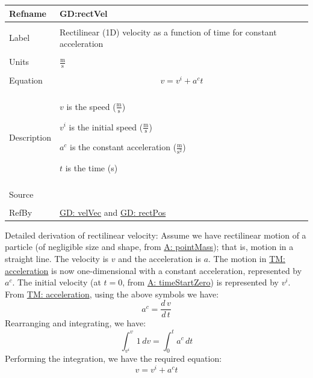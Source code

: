 \documentclass[12pt]{article}
\begin{document}
\noindent \begin{minipage}{\textwidth}
\begin{tabular}{p{} p{}}
\toprule \textbf{Refname} & \textbf{GD:rectVel}
\label{GD:rectVel}
\\ \midrule \\
Label & Rectilinear (1D) velocity as a function of time for constant acceleration
\\ \midrule \\
Units & $\frac{\text{m}}{\text{s}}$
\\ \midrule \\
Equation & \begin{displaymath}
           v={v^{i}}+{a^{c}} t
           \end{displaymath}
\\ \midrule \\
Description & \begin{symbDescription}
              \item{$v$ is the speed ($\frac{\text{m}}{\text{s}}$)}
              \item{${v^{i}}$ is the initial speed ($\frac{\text{m}}{\text{s}}$)}
              \item{${a^{c}}$ is the constant acceleration ($\frac{\text{m}}{\text{s}^{2}}$)}
              \item{$t$ is the time (s)}
              \end{symbDescription}
\\ \midrule \\
Source & \cite[(pg. 8)]{hibbeler2004}
\\ \midrule \\
RefBy & \hyperref[GD:velVec]{GD: velVec} and \hyperref[GD:rectPos]{GD: rectPos}
\\ \bottomrule \end{tabular}
\end{minipage}
Detailed derivation of rectilinear velocity:
Assume we have rectilinear motion of a particle (of negligible size and shape, from \hyperref[pointMass]{A: pointMass}); that is, motion in a straight line. The velocity is $v$ and the acceleration is $a$. The motion in \hyperref[TM:acceleration]{TM: acceleration} is now one-dimensional with a constant acceleration, represented by ${a^{c}}$. The initial velocity (at $t=0$, from \hyperref[timeStartZero]{A: timeStartZero}) is represented by ${v^{i}}$. From \hyperref[TM:acceleration]{TM: acceleration}, using the above symbols we have:
\begin{displaymath}
{a^{c}}=\frac{d\,v}{d\,t}
\end{displaymath}
Rearranging and integrating, we have:
\begin{displaymath}
\int_{{v^{i}}}^{v}{1}\,dv=\int_{0}^{t}{{a^{c}}}\,dt
\end{displaymath}
Performing the integration, we have the required equation:
\begin{displaymath}
v={v^{i}}+{a^{c}} t
\end{displaymath}
\par~
\end{document}
